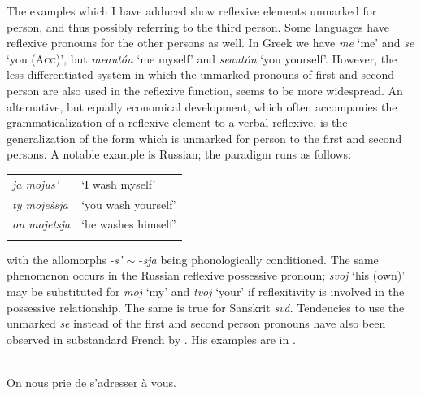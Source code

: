 The examples which I have adduced show reflexive elements unmarked for person, and thus possibly referring to the third person. Some languages have reflexive pronouns for the other persons as well. In Greek we have \textit{me} ‘me’ and \textit{se} ‘you (\textsc{Acc})’, but \textit{meautón} ‘me myself’ and \textit{seautón} ‘you yourself’. However, the less differentiated system in which the unmarked pronouns of first and second person are also used in the reflexive function, seems to be more widespread. An alternative, but equally economical development, which often accompanies the grammaticalization of a reflexive element to a verbal reflexive, is the generalization of the form which is unmarked for person to the first and second persons. A notable example is Russian; the paradigm runs as follows:

\begin{table}
\begin{tabular}{ll}
\lsptoprule

\itshape ja mojus' & ‘I wash myself’\\
\itshape ty moješsja & ‘you wash yourself’\\
\itshape on mojetsja & ‘he washes himself’\\
\lspbottomrule
\end{tabular}
\end{table}

with the allomorphs -\textit{s' ${\sim}$} -\textit{sja} being phonologically conditioned. The same phenomenon occurs in the Russian reflexive possessive pronoun; \textit{svoj} ‘his (own)’ may be substituted for \textit{moj} ‘my’ and \textit{tvoj} ‘your’ if reflexitivity is involved in the possessive relationship. The same is true for Sanskrit \textit{svá}. Tendencies to use the unmarked \textit{se} instead of the first and second person pronouns have also been observed in substandard %
 French by \citet[147]{Frei1929}. His examples are in .

\ea\label{ex:E21}
\langinfo{\LangFren}{}{} \\
 \ea  On nous prie de s'adresser à vous.

